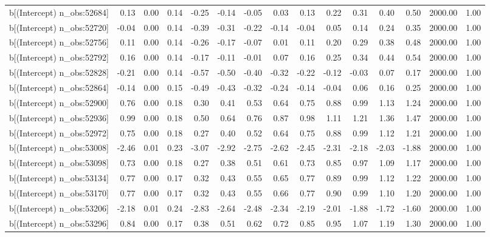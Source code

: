 \begin{table}[ht]
\begin{tabular}{rrrrrrrrrrrrrrr}
  b[(Intercept) n\_obs:52684] & 0.13 & 0.00 & 0.14 & -0.25 & -0.14 & -0.05 & 0.03 & 0.13 & 0.22 & 0.31 & 0.40 & 0.50 & 2000.00 & 1.00 \\ 
  b[(Intercept) n\_obs:52720] & -0.04 & 0.00 & 0.14 & -0.39 & -0.31 & -0.22 & -0.14 & -0.04 & 0.05 & 0.14 & 0.24 & 0.35 & 2000.00 & 1.00 \\ 
  b[(Intercept) n\_obs:52756] & 0.11 & 0.00 & 0.14 & -0.26 & -0.17 & -0.07 & 0.01 & 0.11 & 0.20 & 0.29 & 0.38 & 0.48 & 2000.00 & 1.00 \\ 
  b[(Intercept) n\_obs:52792] & 0.16 & 0.00 & 0.14 & -0.17 & -0.11 & -0.01 & 0.07 & 0.16 & 0.25 & 0.34 & 0.44 & 0.54 & 2000.00 & 1.00 \\ 
  b[(Intercept) n\_obs:52828] & -0.21 & 0.00 & 0.14 & -0.57 & -0.50 & -0.40 & -0.32 & -0.22 & -0.12 & -0.03 & 0.07 & 0.17 & 2000.00 & 1.00 \\ 
  b[(Intercept) n\_obs:52864] & -0.14 & 0.00 & 0.15 & -0.49 & -0.43 & -0.32 & -0.24 & -0.14 & -0.04 & 0.06 & 0.16 & 0.25 & 2000.00 & 1.00 \\ 
  b[(Intercept) n\_obs:52900] & 0.76 & 0.00 & 0.18 & 0.30 & 0.41 & 0.53 & 0.64 & 0.75 & 0.88 & 0.99 & 1.13 & 1.24 & 2000.00 & 1.00 \\ 
  b[(Intercept) n\_obs:52936] & 0.99 & 0.00 & 0.18 & 0.50 & 0.64 & 0.76 & 0.87 & 0.98 & 1.11 & 1.21 & 1.36 & 1.47 & 2000.00 & 1.00 \\ 
  b[(Intercept) n\_obs:52972] & 0.75 & 0.00 & 0.18 & 0.27 & 0.40 & 0.52 & 0.64 & 0.75 & 0.88 & 0.99 & 1.12 & 1.21 & 2000.00 & 1.00 \\ 
  b[(Intercept) n\_obs:53008] & -2.46 & 0.01 & 0.23 & -3.07 & -2.92 & -2.75 & -2.62 & -2.45 & -2.31 & -2.18 & -2.03 & -1.88 & 2000.00 & 1.00 \\ 
  b[(Intercept) n\_obs:53098] & 0.73 & 0.00 & 0.18 & 0.27 & 0.38 & 0.51 & 0.61 & 0.73 & 0.85 & 0.97 & 1.09 & 1.17 & 2000.00 & 1.00 \\ 
  b[(Intercept) n\_obs:53134] & 0.77 & 0.00 & 0.17 & 0.32 & 0.43 & 0.55 & 0.65 & 0.77 & 0.89 & 0.99 & 1.12 & 1.22 & 2000.00 & 1.00 \\ 
  b[(Intercept) n\_obs:53170] & 0.77 & 0.00 & 0.17 & 0.32 & 0.43 & 0.55 & 0.66 & 0.77 & 0.90 & 0.99 & 1.10 & 1.20 & 2000.00 & 1.00 \\ 
  b[(Intercept) n\_obs:53206] & -2.18 & 0.01 & 0.24 & -2.83 & -2.64 & -2.48 & -2.34 & -2.19 & -2.01 & -1.88 & -1.72 & -1.60 & 2000.00 & 1.00 \\ 
  b[(Intercept) n\_obs:53296] & 0.84 & 0.00 & 0.17 & 0.38 & 0.51 & 0.62 & 0.72 & 0.85 & 0.95 & 1.07 & 1.19 & 1.30 & 2000.00 & 1.00 \\ 

\end{tabular}
\end{table}
